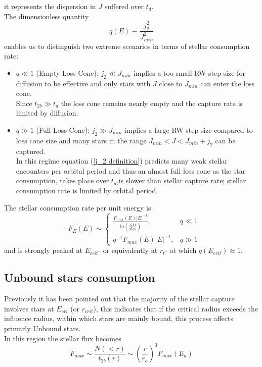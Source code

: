 \documentclass[12pt,twoside,openany]{book}
\begin{document}
it represents the dispersion in $J$ suffered over $t_d$.\\The dimensionless quantity
\begin{equation}
    q(E)\equiv\frac{j_2^2}{J_{min}^2}
\end{equation}
enables us to distinguish two extreme scenarios in terms of stellar consumption rate:
\begin{itemize}
  \item  \(q \ll 1\) (Empty Loss Cone): $j_2\ll J_{min}$ implies a too small RW step size for diffusion to be effective and only stars with $J$ close to $J_{min}$ can enter the loss cone.\\Since $t_{2b}\gg t_d$ the loss cone remeins nearly empty and the capture rate is limited by diffusion.
  \item  \(q \gg 1\) (Full Loss Cone): $j_2\gg J_{min}$ implies a large RW step size compared to loss cone size and many stars in the range $J_{min}<J<J_{min}+j_2$ can be captured.\\In this regime equation (\ref{j_2 definition}) predicts many weak stellar encounters per orbital period and thus an almost full loss cone as the star consumption, takes place over $t_d$,is slower than stellar capture rate; stellar consumption rate is limited by orbital period.
\end{itemize}

The stellar consumption rate per unit energy is
\begin{equation}  
-F_E(E) \sim
\begin{cases}
\frac{F_{max}(E)|E|^{-1}}{ln\left(\frac{GM}{|E|r_t}\right)}, & q \ll 1 \\
q^{-1}F_{max}(E)|E|^{-1},   & q \gg 1
\end{cases}
\end{equation}
and is strongly peaked at $E_{crit}$- or equivalently at $r_t$- at which $q(E_{crit})\approx1$.

\subsection{Unbound stars consumption}
Previously it has been pointed out that the majority of the stellar capture involves stars at $E_{cri}$ (or $r_{crit}$), this indicates that if the critical radius exceeds the influence radius, within which stars are mainly bound, this process affects primarly Unbound stars.\\In this region the stellar flux becomes
\begin{equation}
    F_{max}\sim \frac{N(<r)}{t_{2b}(r)}\sim \left(\frac{r}{r_a}\right)^3 F_{max}(E_a)
\end{equation}
\end{document}
